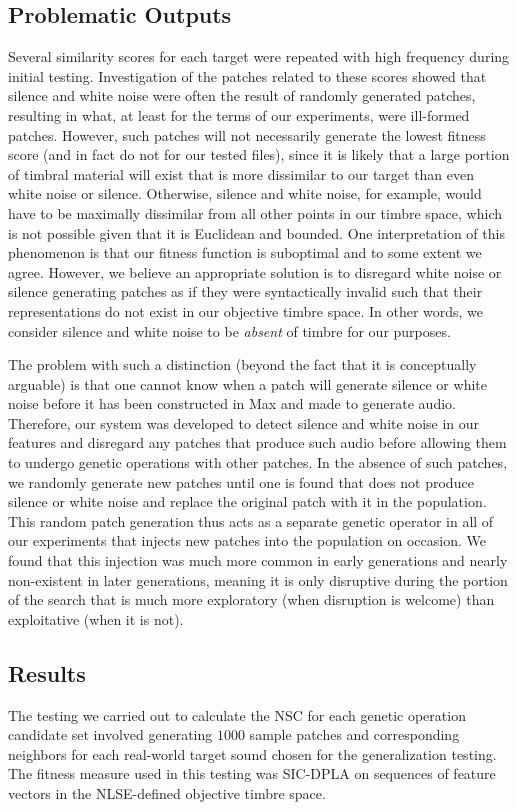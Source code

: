 \documentclass[a4paper,12pt]{report} 	%
\numberwithin{figure}{chapter}
\numberwithin{table}{chapter}
\numberwithin{equation}{chapter}
\begin{document}
\begin{flushleft}
\subsection{Problematic Outputs}
Several similarity scores for each target were repeated with high frequency during initial testing. Investigation of the patches related to these scores showed that silence and white noise were often the result of randomly generated patches, resulting in what, at least for the terms of our experiments, were ill-formed patches. However, such patches will not necessarily generate the lowest fitness score (and in fact do not for our tested files), since it is likely that a large portion of timbral material will exist that is more dissimilar to our target than even white noise or silence. Otherwise, silence and white noise, for example, would have to be maximally dissimilar from all other points in our timbre space, which is not possible given that it is Euclidean and bounded. One interpretation of this phenomenon is that our fitness function is suboptimal and to some extent we agree. However, we believe an appropriate solution is to disregard white noise or silence generating patches as if they were syntactically invalid such that their representations do not exist in our objective timbre space. In other words, we consider silence and white noise to be \emph{absent} of timbre for our purposes.

The problem with such a distinction (beyond the fact that it is conceptually arguable) is that one cannot know when a patch will generate silence or white noise before it has been constructed in Max and made to generate audio. Therefore, our system was developed to detect silence and white noise in our features and disregard any patches that produce such audio before allowing them to undergo genetic operations with other patches. In the absence of such patches, we randomly generate new patches until one is found that does not produce silence or white noise and replace the original patch with it in the population. This random patch generation thus acts as a separate genetic operator in all of our experiments that injects new patches into the population on occasion. We found that this injection was much more common in early generations and nearly non-existent in later generations, meaning it is only disruptive during the portion of the search that is much more exploratory (when disruption is welcome) than exploitative (when it is not).
\subsection{Results}
The testing we carried out to calculate the NSC for each genetic operation candidate set involved generating $1000$ sample patches and corresponding neighbors for each real-world target sound chosen for the generalization testing. The fitness measure used in this testing was SIC-DPLA on sequences of feature vectors in the NLSE-defined objective timbre space.


\end{flushleft}
\end{document}
